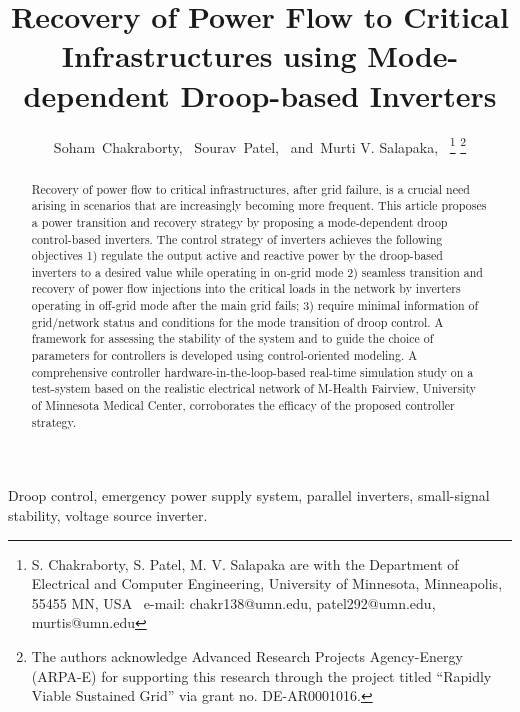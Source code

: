 \documentclass[journal]{IEEEtran}
\begin{document}
\title{Recovery of Power Flow to Critical Infrastructures using Mode-dependent Droop-based Inverters}
\author{Soham~Chakraborty,~
        Sourav~Patel,~
        and~Murti V. Salapaka,~%
\thanks{S. Chakraborty, S. Patel, M. V. Salapaka are with the Department of Electrical and Computer Engineering, University of Minnesota, Minneapolis, 55455 MN, USA~ e-mail: chakr138@umn.edu, patel292@umn.edu, murtis@umn.edu}%
\thanks{The authors acknowledge Advanced Research Projects Agency-Energy (ARPA-E) for supporting this research through the project titled ``Rapidly Viable Sustained Grid'' via grant no. DE-AR0001016.}
}
\maketitle
\begin{abstract}
Recovery of power flow to critical infrastructures, after grid failure, is a crucial need arising in scenarios that are increasingly becoming more frequent. This article proposes a power transition and recovery strategy by proposing a mode-dependent droop control-based inverters. The control strategy of inverters achieves the following objectives 1) regulate the output active and reactive power by the droop-based inverters to a desired value while operating in on-grid mode 2) seamless transition and recovery of power flow injections into the critical loads in the network by inverters operating in off-grid mode after the main grid fails; 3) require minimal information of grid/network status and conditions for the mode transition of droop control. A framework for assessing the stability of the system and to guide the choice of parameters for controllers is developed using control-oriented modeling. A comprehensive controller hardware-in-the-loop-based real-time simulation study on a test-system based on the realistic electrical network of M-Health Fairview, University of Minnesota Medical Center, corroborates the efficacy of the proposed controller strategy.
\end{abstract}
\begin{IEEEkeywords}
Droop control, emergency power supply system, parallel inverters, small-signal stability, voltage source inverter.
\end{IEEEkeywords}
\end{document}
